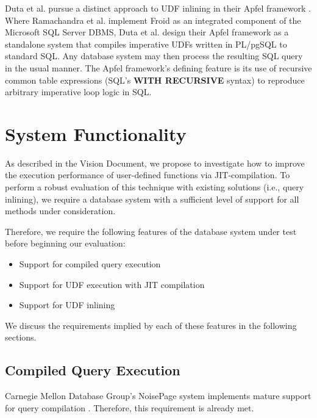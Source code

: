 \documentclass{vldb}
\newcommand{\dbCode}[1]{{\sffamily\small \textbf{#1}}\xspace}
\begin{document}
Duta et al. pursue a distinct approach to UDF inlining in their Apfel framework \cite{apfel}. Where Ramachandra et al. implement Froid as an integrated component of the Microsoft SQL Server DBMS, Duta et al. design their Apfel framework as a standalone system that compiles imperative UDFs written in PL/pgSQL \cite{plpgsql} to standard SQL. Any database system may then process the resulting SQL query in the usual manner. The Apfel framework's defining feature is its use of recursive common table expressions (SQL's \dbCode{WITH RECURSIVE} syntax) to reproduce arbitrary imperative loop logic in SQL.


\section{System Functionality}

As described in the Vision Document, we propose to investigate how to improve the execution performance of user-defined functions via JIT-compilation. To perform a robust evaluation of this technique with existing solutions (i.e., query inlining), we require a database system with a sufficient level of support for all methods under consideration.

Therefore, we require the following features of the database system under test before beginning our evaluation: 

\begin{itemize}
    \item Support for compiled query execution
    \item Support for UDF execution with JIT compilation 
    \item Support for UDF inlining 
\end{itemize}

We discuss the requirements implied by each of these features in the following sections.

\subsection{Compiled Query Execution}

Carnegie Mellon Database Group's NoisePage system implements mature support for query compilation \cite{pcq}. Therefore, this requirement is already met.
\end{document}
